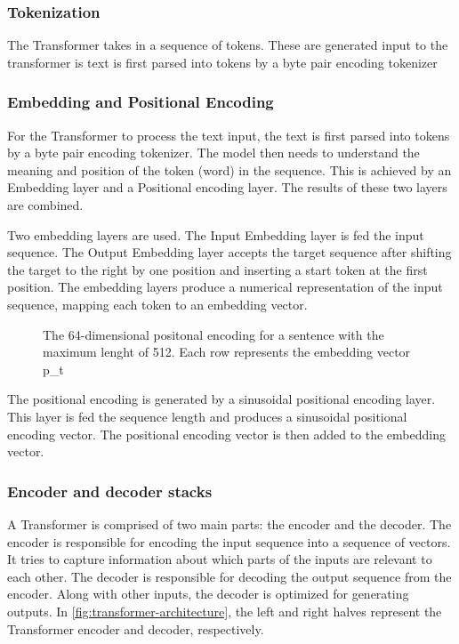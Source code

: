 \subsubsection{Tokenization}
\label{sec:tokenization}
The Transformer takes in a sequence of tokens. These are generated input to the  transformer is text is first parsed into tokens by a byte pair encoding tokenizer

\subsubsection{Embedding and Positional Encoding}
\label{sec:embedding-and-positional-encoding}
For the Transformer to process the text input, the text is first parsed into tokens by a byte pair encoding tokenizer. The model then needs to understand the meaning and position of the token (word) in the sequence. This is achieved by an Embedding layer and a Positional encoding layer. The results of these two layers are combined.

Two embedding layers are used. The Input Embedding layer is fed the input sequence. The Output Embedding layer accepts the target sequence after shifting the target to the right by one position and inserting a start token at the first position. The embedding layers produce a numerical representation of the input sequence, mapping each token to an embedding vector.

\begin{figure}[htp]
    \centering
    
    \caption{The 64-dimensional positonal encoding for a sentence with the maximum lenght of 512. Each row represents the embedding vector p\_t}
\end{figure}

The positional encoding is generated by a sinusoidal positional encoding layer. This layer is fed the sequence length and produces a sinusoidal positional encoding vector. The positional encoding vector is then added to the embedding vector.

\subsubsection{Encoder and decoder stacks}
\label{sec:encoder-decoder-stacks}
A Transformer is comprised of two main parts: the encoder and the decoder. The encoder is responsible for encoding the input sequence into a sequence of vectors. It tries to capture information about which parts of the inputs are relevant to each other. The decoder is responsible for decoding the output sequence from the encoder. Along with other inputs, the decoder is optimized for generating outputs. In \cref{fig:transformer-architecture}, the left and right halves represent the Transformer encoder and decoder, respectively. 

